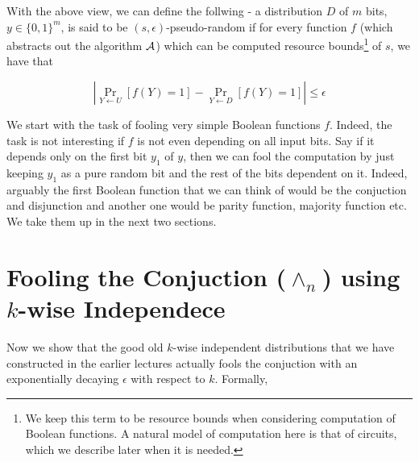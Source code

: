\vspace{2mm}

With the above view, we can define the follwing - a distribution $D$ of $m$ bits, $y \in \{0,1\}^m$, is said to be $(s,\epsilon)$-pseudo-random if for every function $f$ (which abstracts out the algorithm ${\cal A}$) which can be computed resource bounds\footnote{We keep this term to be resource bounds when considering computation of Boolean functions. A natural model of computation here is that of circuits, which we describe later when it is needed.} of $s$, we have that 

$$\left| \Pr_{Y \leftarrow U} [f(Y) = 1] - \Pr_{Y \leftarrow D} [f(Y) = 1] \right| \le \epsilon$$

\noindent We start with the task of fooling very simple Boolean functions $f$. Indeed, the task is not interesting if $f$ is not even depending on all input bits. Say if it depends only on the first bit $y_1$ of $y$, then we can fool the computation by just keeping $y_1$ as a pure random bit and the rest of the bits dependent on it. Indeed, arguably the first Boolean function that we can think of would be the conjuction and disjunction and another one would be parity function, majority function etc. We take them up in the next two sections.

\section{Fooling the Conjuction ($\land_n$) using $k$-wise Independece}

Now we show that the good old $k$-wise independent distributions that we have constructed in the earlier lectures actually fools the conjuction with an exponentially decaying $\epsilon$ with respect to $k$. Formally,

